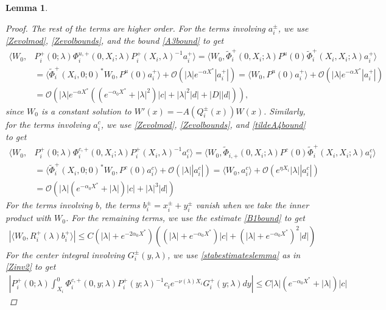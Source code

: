 \documentclass[10pt,reqno]{amsart}
\theoremstyle{plain}
\newtheorem{lemma}[theorem]{Lemma}
\theoremstyle{definition}
\theoremstyle{remark}
\numberwithin{theorem}{section}
\numberwithin{equation}{section}
\begin{document}
\begin{lemma}
\begin{proof}
The rest of the terms are higher order. For the terms involving $a_i^\pm$, we use \cref{Zevolmod}, \cref{Zevolbounds}, and the bound \cref{A3bound} to get
\begin{align*}
\langle W_0, &P_i^+(0; \lambda) \Phi_i^{u,+}(0, X_i; \lambda) P_i^+(X_i, \lambda)^{-1} a_i^+ \rangle = \langle W_0, \tilde{\Phi}_i^+(0, X_i; \lambda) 
P^u(0) \tilde{\Phi}_i^+(X_i, X_i; \lambda)a_i^+ \rangle \\
&= \langle \tilde{\Phi}_i^+(X_i, 0; 0)^* W_0, P^u(0) a_i^+ \rangle + \mathcal{O}(|\lambda|e^{-\alpha X^*}|a_i^+|) = \langle W_0, P^u(0) a_i^+ \rangle + \mathcal{O}(|\lambda|e^{-\alpha X^*}|a_i^+|) \\
&= \mathcal{O}\left(|\lambda|e^{-\alpha X^*} \left( (e^{-\alpha_0 X^*} + |\lambda|^2) |c| + |\lambda|^2 |d| + |D||d| \right) \right),
\end{align*}
since $W_0$ is a constant solution to $W'(x) = -A(Q_i^\pm(x)) W(x)$. Similarly, for the terms involving $a_i^c$, we use \cref{Zevolmod}, \cref{Zevolbounds}, and \cref{tildeA4bound}
 to get
\begin{align*}
\langle W_0, &P_i^+(0; \lambda) \Phi_i^{c,+}(0, X_i; \lambda) P_i^+(X_i, \lambda)^{-1} a_i^c \rangle = \langle W_0, \tilde{\Phi}_{i,+}(0, X_i; \lambda) 
P^c(0) \tilde{\Phi}_i^{+}(X_i, X_i; \lambda)a_i^c \rangle \\
&= \langle \tilde{\Phi}_i^+(X_i, 0; 0)^* W_0, P^c(0) a_i^c \rangle + \mathcal{O}(|\lambda||a_i^c|) = \langle W_0, a_i^c \rangle + \mathcal{O}(e^{\eta X_i} |\lambda||a_i^c|) \\
&= \mathcal{O}\left( |\lambda| (e^{-\alpha_0 X^*} + |\lambda|) |c| +|\lambda|^3 |d| \right)
\end{align*}
For the terms involving $b$, the terms $b_i^\pm = x_i^\pm + y_i^\pm$ vanish when we take the inner product with $W_0$. For the remaining terms, we use the estimate \cref{B1bound} to get
\begin{align*}
|\langle W_0, R_i^+(\lambda) b_i^+ \rangle |\leq C \left(|\lambda| + e^{-2 \alpha_0 X^*}\right)\left((|\lambda|+e^{-\alpha_0 X^*})|c| + (|\lambda| + e^{-\alpha_0 X^*})^2 |d| \right)
\end{align*}
For the center integral involving $G_i^\pm(y, \lambda)$, we use \cref{stabestimateslemma} as in \cref{Zinv2} to get
\begin{align*}
\left| P_i^+(0; \lambda) \int_{X_i}^0 \Phi_i^{c,+}(0, y; \lambda) P_i^+(y; \lambda)^{-1} c_i e^{-\nu(\lambda)X_i} G_i^+(y; \lambda)  dy \right| \leq C |\lambda| (e^{-\alpha_0 X^*} + |\lambda|) |c|
\end{align*}

\end{proof}
\end{lemma}
\end{document}

